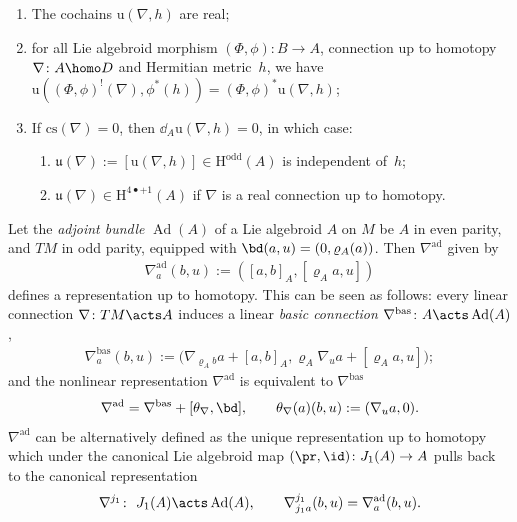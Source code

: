\begin{proposition}\label{pro : secondary}\quad
 \begin{enumerate}\itemsep=0pt
 \item[$a)$] The cochains $\mathrm{u}(\nabla,h)$ are real;
 \item[$b)$] for all Lie algebroid morphism $(\Phi,\phi)\colon B \to A$, connection up to homotopy $\nabla\colon A \homo D$ and Hermitian metric~$h$, we have $\mathrm{u}((\Phi,\phi)^!(\nabla),\phi^*(h)) = (\Phi,\phi)^*\mathrm{u}(\nabla,h)$;
 \item[$c)$] If $\mathrm{cs}(\nabla)=0$, then $\dd_A\mathrm{u}(\nabla,h)=0$, in which case:
 \begin{enumerate}\itemsep=0pt
 \item[$i)$] $\mathfrak{u}(\nabla):=[\mathrm{u}(\nabla,h)] \in \mathrm{H}^{\mathrm{odd}}(A)$ is independent of~$h$;
 \item[$ii)$] $\mathfrak{u}(\nabla) \in \mathrm{H}^{4\bullet+1}(A)$ if $\nabla$ is a real connection up to homotopy.
 \end{enumerate}
 \end{enumerate}
\end{proposition}

\begin{main_example}Let the \emph{adjoint bundle} $\operatorname{Ad}(A)$ of a Lie algebroid $A$ on $M$ be $A$ in even parity, and $TM$ in odd parity, equipped with $\bd(a,u) = (0,\varrho_A(a))$. Then $\nabla^{\mathrm{ad}}$ given by
\begin{gather*}
 \nabla^{\mathrm{ad}}_a(b,u):=([a,b]_A,[\varrho_Aa,u])
\end{gather*}defines a representation up to homotopy. This can be seen as follows:
every linear connection $\nabla\colon TM \acts A$ induces a linear {\it basic connection} $\nabla^{\mathrm{bas}} \colon A \acts \operatorname{Ad}(A)$,
\begin{align*}
\nabla^{\mathrm{bas}}_a(b,u):=\big(\nabla_{\varrho_A b}a+[a,b]_A,\varrho_A\nabla_{u}a+[\varrho_A a,u]\big);
\end{align*}and the nonlinear representation $\nabla^{\mathrm{ad}}$ is equivalent to $\nabla^{\mathrm{bas}}$
\begin{gather*}
\nabla^{\mathrm{ad}}=\nabla^{\mathrm{bas}} + [\theta_{\nabla},\bd], \qquad \theta_{\nabla}(a)(b,u):=(\nabla_ua,0).
\end{gather*}$\nabla^{\mathrm{ad}}$ can be alternatively defined as the unique representation up to homotopy which under the canonical Lie algebroid map $(\pr,\id)\colon J_1(A) \to A$ pulls back to the canonical representation
\begin{gather*}
\nabla^{j_1}\colon \ J_1(A) \acts \operatorname{Ad}(A), \qquad \nabla^{j_1}_{j_1a}(b,u) = \nabla^{\mathrm{ad}}_a(b,u).
\end{gather*}
\end{main_example}

